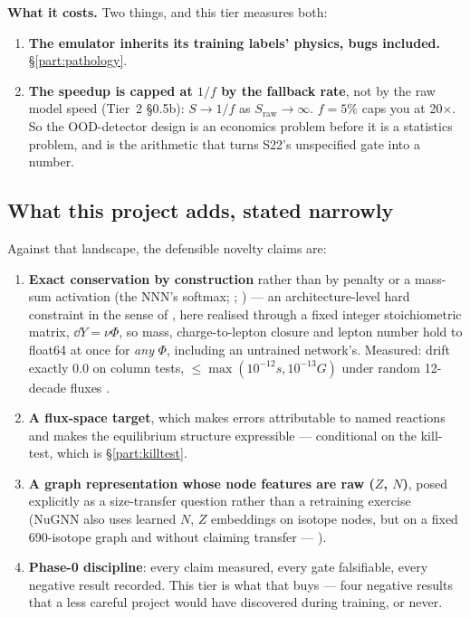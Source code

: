 \textbf{What it costs.} Two things, and this tier measures both:

\begin{enumerate}
\item \textbf{The emulator inherits its training labels' physics, bugs
  included.} \S\ref{part:pathology}.
\item \textbf{The speedup is capped at $1/f$ by the fallback rate}, not by the
  raw model speed (Tier~2 \S 0.5b): $S \to 1/f$ as $S_{\mathrm{raw}} \to
  \infty$. $f = 5\%$ caps you at 20$\times$. So the OOD-detector design is an
  economics problem before it is a statistics problem, and 
  is the arithmetic that turns S22's unspecified gate into a number.
\end{enumerate}

\subsection{What this project adds, stated narrowly}
\label{sec:whatadds}

Against that landscape, the defensible novelty claims are:

\begin{enumerate}
\item \textbf{Exact conservation by construction} rather than by penalty or a
  mass-sum activation (the NNN's softmax; \citealt{fan2022}; \citealt{zhang2025})
  --- an architecture-level hard constraint in the sense of
  \citet{beucler2021}, here realised through a fixed integer stoichiometric
  matrix, $\dd Y = \nu\Phi$, so mass, charge-to-lepton closure and lepton number
  hold to float64 at once for \emph{any} $\Phi$, including an untrained
  network's. Measured: drift exactly 0.0 on column tests, $\le \max(10^{-12}s,
  10^{-13}G)$ under random 12-decade fluxes .
\item \textbf{A flux-space target}, which makes errors attributable to named
  reactions and makes the equilibrium structure expressible --- conditional on
  the kill-test, which is \S\ref{part:killtest}.
\item \textbf{A graph representation whose node features are raw ($Z$, $N$)},
  posed explicitly as a size-transfer question rather than a retraining exercise
  (NuGNN also uses learned $N$, $Z$ embeddings on isotope nodes, but on a fixed
  690-isotope graph and without claiming transfer --- \citealt{kim2026}).
\item \textbf{Phase-0 discipline}: every claim measured, every gate falsifiable,
  every negative result recorded. This tier is what that buys --- four negative
  results that a less careful project would have discovered during training, or
  never.
\end{enumerate}

